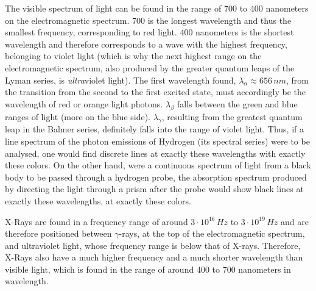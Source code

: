 The visible spectrum of light can be found in the range of 700 to 400 nanometers on the electromagnetic spectrum. 700 is the longest wavelength and thus the smallest frequency, corresponding to red light. 400 nanometers is the shortest wavelength and therefore corresponds to a wave with the highest frequency, belonging to violet light (which is why the next highest range on the electromagnetic spectrum, also produced by the greater quantum leaps of the Lyman series, is \emph{ultra}violet light). The first wavelength found, $\lambda_\alpha \approx 656\, nm$, from the transition from the second to the first excited state, must accordingly be the wavelength of red or orange light photons. $\lambda_\beta$ falls between the green and blue ranges of light (more on the blue side). $\lambda_\gamma$, resulting from the greatest quantum leap in the Balmer series, definitely falls into the range of violet light. Thus, if a line spectrum of the photon emissions of Hydrogen (its spectral series) were to be analysed, one would find discrete lines at exactly these wavelengths with exactly these colors. On the other hand, were a continuous spectrum of light from a black body to be passed through a hydrogen probe, the absorption spectrum produced by directing the light through a prism after the probe would show black lines at exactly these wavelengths, at exactly these colors.



X-Rays are found in a frequency range of around $3 \cdot 10^{16}\, Hz$ to $3 \cdot 10^{19}\, Hz$ and are therefore positioned between $\gamma$-rays, at the top of the electromagnetic spectrum, and ultraviolet light, whose frequency range is below that of X-rays. Therefore, X-Rays also have a much higher frequency and a much shorter wavelength than visible light, which is found in the range of around 400 to 700 nanometers in wavelength.

